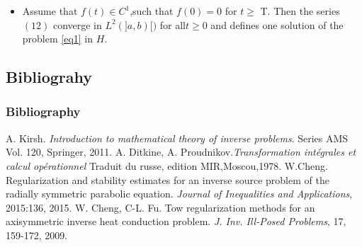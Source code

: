 \documentclass[11pt]{beamer}
\begin{document}
\begin{frame}
\begin{theorem}
	\begin{itemize}
		\item Assume that $ f(t)\in C^{1}$,such that $f(0)=0$ for $t\geq$ T. Then the series $ (12)$ converge in $ L^{2}(]a,b)[)$ for all$ t\geq 0$ and defines one solution of the problem \eqref{eq1}  in $H.$
	\end{itemize}
\end{theorem}
\end{frame}
\begin{frame}
\section{Bibliograhy}
\frametitle{Bibliography}
\begin{thebibliography}{widestlabel}

	A. Kirsh. \textit{Introduction to mathematical theory of inverse problems}. Series AMS Vol. 120, Springer, 2011.
	A. Ditkine, A. Proudnikov.\textit{Transformation intégrales et calcul opérationnel} Traduit du russe, edition MIR,Moscou,1978.
	 W.Cheng. Regularization and stability estimates for an inverse source problem of the radially symmetric parabolic equation. \textit{Journal of Inequalities and Applications}, 2015:136, 2015.
	W. Cheng, C-L. Fu. Tow regularization methods for an axisymmetric inverse heat conduction problem. \textit{J. Inv. Ill-Posed Problems}, 17, 159-172, 2009.
\end{thebibliography}
\end{frame}
\end{document}
